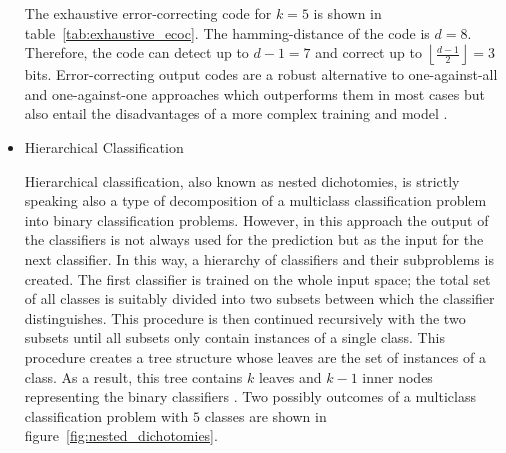 \documentclass[article,type=msc,colorback,accentcolor=tud7b]{tudthesis}
\begin{document}
\begin{itemize}
\begin{table}[H]
          \caption[Output codes for a multiclass classification problem]{Different output codes for a multiclass classification problem with five classes}
          \label{tab:exhaustive_ecoc}
        \end{table}

        The exhaustive error-correcting code for $k=5$ is shown in table~\ref{tab:exhaustive_ecoc}. The hamming-distance of the code is $d=8$. Therefore, the code can detect up to $d-1=7$ and correct up to $\left\lfloor\frac{d-1}{2}\right\rfloor=3$ bits. Error-correcting output codes are a robust alternative to one-against-all and one-against-one approaches which outperforms them in most cases but also entail the disadvantages of a more complex training and model \autocite[Section~4]{Dietterich1994}.
      \item Hierarchical Classification

        Hierarchical classification, also known as nested dichotomies, is strictly speaking also a type of decomposition of a multiclass classification problem into binary classification problems. However, in this approach the output of the classifiers is not always used for the prediction but as the input for the next classifier. In this way, a hierarchy of classifiers and their subproblems is created. The first classifier is trained on the whole input space; the total set of all classes is suitably divided into two subsets between which the classifier distinguishes. This procedure is then continued recursively with the two subsets until all subsets only contain instances of a single class. This procedure creates a tree structure whose leaves are the set of instances of a class. As a result, this tree contains $k$ leaves and $k-1$ inner nodes representing the binary classifiers \autocite{Dong2005}. Two possibly outcomes of a multiclass classification problem with $5$ classes are shown in figure~\ref{fig:nested_dichotomies}.


\end{itemize}
\end{document}
